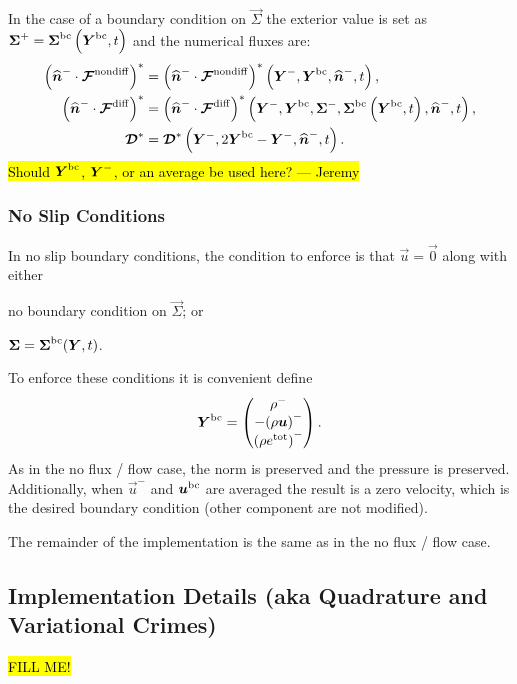 \documentclass{report}
\begin{document}
In the case of a boundary condition on $\vec{\Sigma}$ the exterior value is set
as $\vec{\Sigma}^{+} = \vec{\Sigma}^{\rm bc}\left(\vec{Y}^{\rm bc}, t\right)$
and the numerical fluxes are:
\begin{align}
  {\left( \nhat^{-} \cdot \Fnondiff\right)}^{*} &=
  {\left( \nhat^{-} \cdot \Fnondiff\right)}^{*}
  \left(\vec{Y}^{-}, \vec{Y}^{\rm bc}, \nhat^{-}, t\right),\\
  {\left( \nhat^{-} \cdot \Fdiff\right)}^{*} &=
  {\left( \nhat^{-} \cdot \Fdiff\right)}^{*}
  \left(\vec{Y}^{-}, \vec{Y}^{\rm bc}, \vec{\Sigma}^{-}, \vec{\Sigma}^{\rm bc}
  \left(\vec{Y}^{\rm bc}, t\right),
  \nhat^{-}, t\right),\\
  \diffusive^{*} &=
  \diffusive^{*}
  \left(\vec{Y}^{-}, 2\vec{Y}^{\rm bc}-\vec{Y}^{-}, \nhat^{-}, t\right).
\end{align}
\hl{Should $\vec{Y}^{\rm bc}$, $\vec{Y}^{\rm -}$, or an average be used here?
--- Jeremy}

\subsubsection{No Slip Conditions}
In no slip boundary conditions, the condition to enforce is that $\vec{u} =
\vec{0}$ along with either
\begin{enumerate*}[label = (\roman*)]
  \item no boundary condition on $\vec{\Sigma}$; or
  \item $\vec{\Sigma} = \vec{\Sigma}^{\rm bc}(\vec{Y}, t)$.
\end{enumerate*}
To enforce these conditions it is convenient define
\begin{align}
  \vec{Y}^{\rm bc}
  =
  \begin{pmatrix}
    \rho^{-}\\
    -{\left(\rho \vec{u}\right)}^{-}\\
    {\left(\rho e^{\rm tot}\right)}^{-}
  \end{pmatrix}.
\end{align}
As in the no flux / flow case, the norm is preserved and the pressure is
preserved.  Additionally, when $\vec{u}^{-}$ and
$\vec{u}^{\rm bc}$ are averaged the result is a zero velocity,
which is the desired boundary condition (other component are not modified).

The remainder of the implementation is the same as in the no flux / flow case.

\subsection{Implementation Details (aka Quadrature and Variational Crimes)}
\hl{FILL ME\@!}
\end{document}
